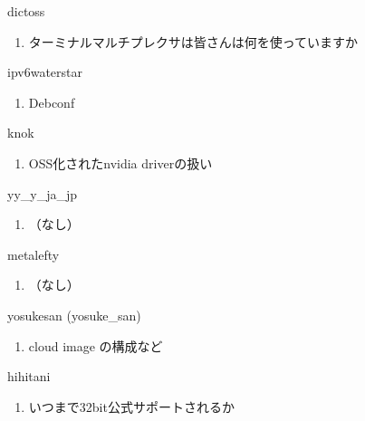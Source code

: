 \begin{prework}{ dictoss }
  \begin{enumerate}
  \item ターミナルマルチプレクサは皆さんは何を使っていますか
  \end{enumerate}
\end{prework}

\begin{prework}{ ipv6waterstar }
  \begin{enumerate}
  \item Debconf
  \end{enumerate}
\end{prework}

\begin{prework}{ knok }
  \begin{enumerate}
  \item OSS化されたnvidia driverの扱い
  \end{enumerate}
\end{prework}

\begin{prework}{ yy\_y\_ja\_jp }
  \begin{enumerate}
  \item （なし）
  \end{enumerate}
\end{prework}

\begin{prework}{ metalefty }
  \begin{enumerate}
  \item （なし）
  \end{enumerate}
\end{prework}

\begin{prework}{ yosukesan (yosuke\_san) }
  \begin{enumerate}
  \item cloud image の構成など
  \end{enumerate}
\end{prework}

\begin{prework}{ hihitani }
  \begin{enumerate}
  \item いつまで32bit公式サポートされるか
  \end{enumerate}
\end{prework}
